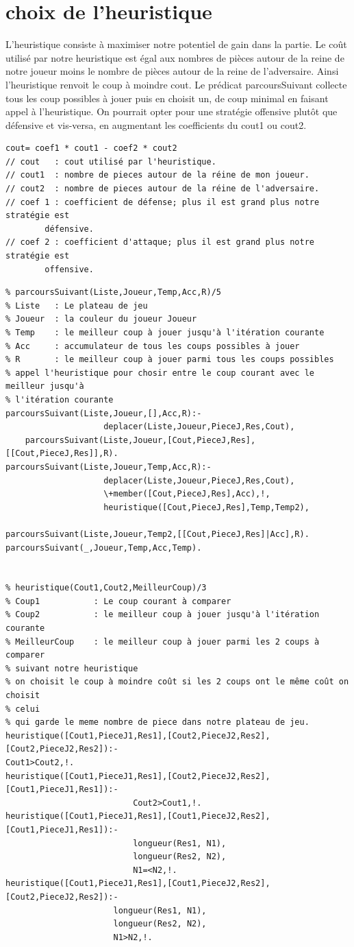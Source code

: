\documentclass[a4paper,10pt]{article}
\begin{document}
\section{choix de l'heuristique}
L'heuristique consiste à maximiser notre potentiel de gain dans la partie. Le
coût utilisé par notre heuristique est égal aux nombres de pièces autour de la
reine de notre joueur moins le nombre de pièces autour de la reine de
l'adversaire. Ainsi l'heuristique renvoit le coup à moindre cout. Le prédicat 
parcoursSuivant collecte  tous les coup possibles à jouer puis en choisit
un, de coup minimal en faisant appel à l'heuristique.
On pourrait opter pour une stratégie offensive plutôt que défensive et
vis-versa, en augmentant les coefficients du cout1 ou cout2.
\begin{verbatim}
cout= coef1 * cout1 - coef2 * cout2
// cout   : cout utilisé par l'heuristique.
// cout1  : nombre de pieces autour de la réine de mon joueur.
// cout2  : nombre de pieces autour de la réine de l'adversaire.
// coef 1 : coefficient de défense; plus il est grand plus notre stratégie est
	    défensive.
// coef 2 : coefficient d'attaque; plus il est grand plus notre stratégie est
	    offensive.
\end{verbatim}
\begin{verbatim}
% parcoursSuivant(Liste,Joueur,Temp,Acc,R)/5
% Liste   : Le plateau de jeu
% Joueur  : la couleur du joueur Joueur
% Temp    : le meilleur coup à jouer jusqu'à l'itération courante
% Acc     :	accumulateur de tous les coups possibles à jouer
% R       :	le meilleur coup à jouer parmi tous les coups possibles
% appel l'heuristique pour chosir entre le coup courant avec le meilleur jusqu'à
% l'itération courante
parcoursSuivant(Liste,Joueur,[],Acc,R):-
					deplacer(Liste,Joueur,PieceJ,Res,Cout),	
	parcoursSuivant(Liste,Joueur,[Cout,PieceJ,Res],[[Cout,PieceJ,Res]],R).	
parcoursSuivant(Liste,Joueur,Temp,Acc,R):-
					deplacer(Liste,Joueur,PieceJ,Res,Cout),
					\+member([Cout,PieceJ,Res],Acc),!,
				    heuristique([Cout,PieceJ,Res],Temp,Temp2),	
									
parcoursSuivant(Liste,Joueur,Temp2,[[Cout,PieceJ,Res]|Acc],R).			
parcoursSuivant(_,Joueur,Temp,Acc,Temp).


% heuristique(Cout1,Cout2,MeilleurCoup)/3
% Coup1           : Le coup courant à comparer
% Coup2           : le meilleur coup à jouer jusqu'à l'itération courante
% MeilleurCoup    : le meilleur coup à jouer parmi les 2 coups à comparer
% suivant notre heuristique
% on choisit le coup à moindre coût si les 2 coups ont le même coût on choisit
% celui 
% qui garde le meme nombre de piece dans notre plateau de jeu.
heuristique([Cout1,PieceJ1,Res1],[Cout2,PieceJ2,Res2],[Cout2,PieceJ2,Res2]):-
Cout1>Cout2,!.
heuristique([Cout1,PieceJ1,Res1],[Cout2,PieceJ2,Res2],[Cout1,PieceJ1,Res1]):-
					      Cout2>Cout1,!.
heuristique([Cout1,PieceJ1,Res1],[Cout1,PieceJ2,Res2],[Cout1,PieceJ1,Res1]):-
					      longueur(Res1, N1),
					      longueur(Res2, N2),
					      N1=<N2,!.
heuristique([Cout1,PieceJ1,Res1],[Cout1,PieceJ2,Res2],[Cout2,PieceJ2,Res2]):-
					  longueur(Res1, N1),
					  longueur(Res2, N2),
					  N1>N2,!.
\end{verbatim}
\end{document}
